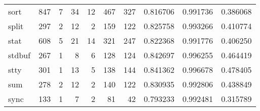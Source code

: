 \begin{tabular}{lrrrrrrrrr}
sort      &                    847 &                                  7 &                                34 &                               12 &                               467 &                             327 &                                0.816706 &                               0.991736 &                             0.386068 \\
split     &                    297 &                                  2 &                                12 &                                2 &                               159 &                             122 &                                0.825758 &                               0.993266 &                             0.410774 \\
stat      &                    608 &                                  5 &                                21 &                               14 &                               321 &                             247 &                                0.822368 &                               0.991776 &                             0.406250 \\
stdbuf    &                    267 &                                  1 &                                 8 &                                6 &                               128 &                             124 &                                0.842697 &                               0.996255 &                             0.464419 \\
stty      &                    301 &                                  1 &                                13 &                                5 &                               138 &                             144 &                                0.841362 &                               0.996678 &                             0.478405 \\
sum       &                    278 &                                  2 &                                12 &                                2 &                               140 &                             122 &                                0.830935 &                               0.992806 &                             0.438849 \\
sync      &                    133 &                                  1 &                                 7 &                                2 &                                81 &                              42 &                                0.793233 &                               0.992481 &                             0.315789 \\

\end{tabular}
